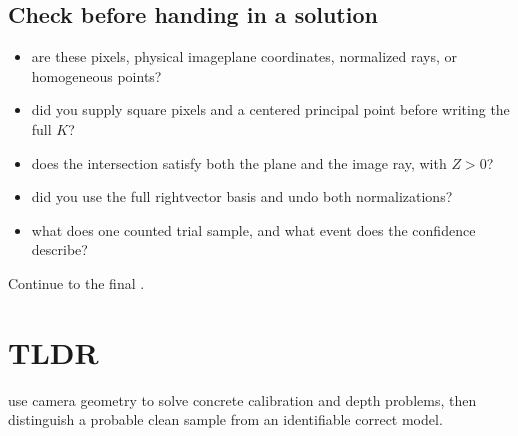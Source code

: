 \documentclass[letterpaper,11pt,english,openany,oneside]{jupyterBook}
\begin{document}
\subsection{Check before handing in a solution}
\label{\detokenize{lectures/lecture03/review:check-before-handing-in-a-solution}}\begin{itemize}
\item {}
\sphinxAtStartPar
{} are these pixels, physical image\sphinxhyphen{}plane coordinates, normalized rays, or homogeneous points?

\item {}
\sphinxAtStartPar
{} did you supply square pixels and a centered principal point before writing the full \(K\)?

\item {}
\sphinxAtStartPar
{} does the intersection satisfy both the plane and the image ray, with \(Z>0\)?

\item {}
\sphinxAtStartPar
{} did you use the full right\sphinxhyphen{}vector basis and undo both normalizations?

\item {}
\sphinxAtStartPar
{} what does one counted trial sample, and what event does the confidence describe?

\end{itemize}

\sphinxAtStartPar
Continue to the final {\hyperref[\detokenize{lectures/lecture03/tldr::doc}]{}}.

\sphinxstepscope

\clearpage


\section{TLDR}
\label{\detokenize{lectures/lecture03/tldr:tldr}}\label{\detokenize{lectures/lecture03/tldr:lec03-tldr}}\label{\detokenize{lectures/lecture03/tldr::doc}}
\sphinxAtStartPar
{} use camera geometry to solve concrete calibration and depth problems, then distinguish a probable clean sample from an identifiable correct model.
\end{document}
